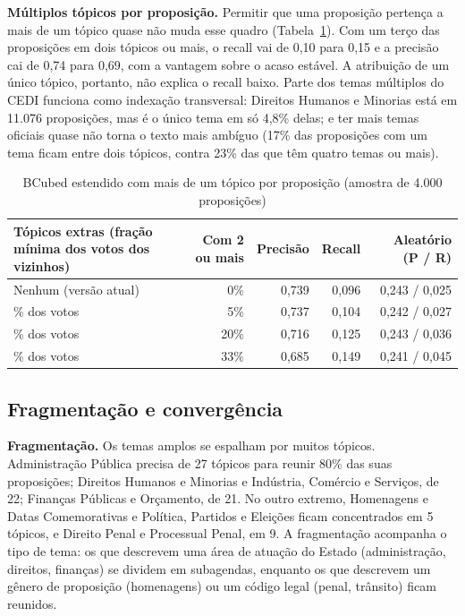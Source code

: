 \textbf{Múltiplos tópicos por proposição.} Permitir que uma proposição pertença a mais de um tópico quase não muda esse quadro (Tabela~\ref{tab:multitopico}). Com um terço das proposições em dois tópicos ou mais, o recall vai de 0,10 para 0,15 e a precisão cai de 0,74 para 0,69, com a vantagem sobre o acaso estável. A atribuição de um único tópico, portanto, não explica o recall baixo. Parte dos temas múltiplos do CEDI funciona como indexação transversal: Direitos Humanos e Minorias está em 11.076 proposições, mas é o único tema em só 4,8\% delas; e ter mais temas oficiais quase não torna o texto mais ambíguo (17\% das proposições com um tema ficam entre dois tópicos, contra 23\% das que têm quatro temas ou mais).

\begin{table}[H]
\centering
\caption{BCubed estendido com mais de um tópico por proposição (amostra de 4.000 proposições)}
\label{tab:multitopico}
\small
\begin{tabularx}{\textwidth}{>{\raggedright\arraybackslash}X r r r r}
\toprule
\textbf{Tópicos extras (fração mínima dos votos dos vizinhos)} & \textbf{Com 2 ou mais} & \textbf{Precisão} & \textbf{Recall} & \textbf{Aleatório (P / R)} \\
\midrule
Nenhum (versão atual) & 0\% & 0,739 & 0,096 & 0,243 / 0,025 \\
34\% dos votos & 5\% & 0,737 & 0,104 & 0,242 / 0,027 \\
25\% dos votos & 20\% & 0,716 & 0,125 & 0,243 / 0,036 \\
15\% dos votos & 33\% & 0,685 & 0,149 & 0,241 / 0,045 \\
\bottomrule
\end{tabularx}
\end{table}

\subsection{Fragmentação e convergência}
\label{subsec:res-frag}

\textbf{Fragmentação.} Os temas amplos se espalham por muitos tópicos. Administração Pública precisa de 27 tópicos para reunir 80\% das suas proposições; Direitos Humanos e Minorias e Indústria, Comércio e Serviços, de 22; Finanças Públicas e Orçamento, de 21. No outro extremo, Homenagens e Datas Comemorativas e Política, Partidos e Eleições ficam concentrados em 5 tópicos, e Direito Penal e Processual Penal, em 9. A fragmentação acompanha o tipo de tema: os que descrevem uma área de atuação do Estado (administração, direitos, finanças) se dividem em subagendas, enquanto os que descrevem um gênero de proposição (homenagens) ou um código legal (penal, trânsito) ficam reunidos.

